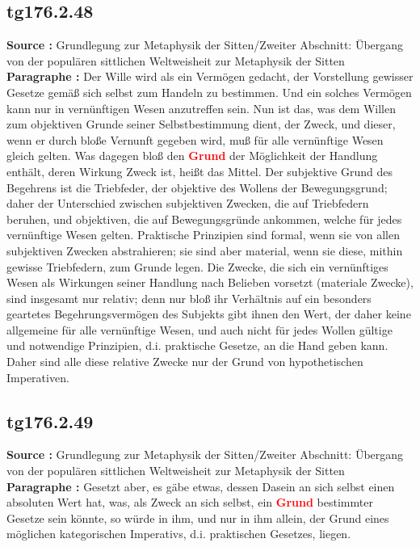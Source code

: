 \documentclass[a4paper,12pt,twoside]{book}
\newcommand{\match}[1]{\textcolor{red}{\textbf{#1}}}
\begin{document}
	\subsection*{tg176.2.48} 
	\textbf{Source : }Grundlegung zur Metaphysik der Sitten/Zweiter Abschnitt: Übergang von der populären sittlichen Weltweisheit zur Metaphysik der Sitten\\  
	
	\noindent\textbf{Paragraphe : }Der Wille wird als ein Vermögen gedacht, der Vorstellung gewisser Gesetze gemäß sich selbst zum Handeln zu bestimmen. Und ein solches Vermögen kann nur in vernünftigen Wesen anzutreffen sein. Nun ist das, was dem Willen zum objektiven Grunde seiner Selbstbestimmung dient, der Zweck, und dieser, wenn er durch bloße Vernunft gegeben wird, muß für alle vernünftige Wesen gleich gelten. Was dagegen bloß den \match{Grund} der Möglichkeit der Handlung enthält, deren Wirkung Zweck ist, heißt das Mittel. Der subjektive Grund des Begehrens ist die Triebfeder, der objektive des Wollens der Bewegungsgrund; daher der Unterschied zwischen subjektiven Zwecken, die auf Triebfedern beruhen, und objektiven, die auf Bewegungsgründe ankommen, welche für jedes vernünftige Wesen gelten. Praktische Prinzipien sind formal, wenn sie von allen subjektiven Zwecken abstrahieren; sie sind aber material, wenn sie diese, mithin gewisse Triebfedern, zum Grunde legen. Die Zwecke, die sich ein vernünftiges Wesen als Wirkungen seiner Handlung nach Belieben vorsetzt (materiale Zwecke), sind insgesamt nur relativ; denn nur bloß ihr Verhältnis auf ein besonders geartetes Begehrungsvermögen des Subjekts gibt ihnen den Wert, der daher keine allgemeine für alle vernünftige Wesen, und auch nicht für jedes Wollen gültige und notwendige Prinzipien, d.i. praktische Gesetze, an die Hand geben kann. Daher sind alle diese relative Zwecke nur der Grund von hypothetischen Imperativen. 
	
	\subsection*{tg176.2.49} 
	\textbf{Source : }Grundlegung zur Metaphysik der Sitten/Zweiter Abschnitt: Übergang von der populären sittlichen Weltweisheit zur Metaphysik der Sitten\\  
	
	\noindent\textbf{Paragraphe : }Gesetzt aber, es gäbe etwas, dessen Dasein an sich selbst einen absoluten Wert hat, was, als Zweck an sich selbst, ein \match{Grund} bestimmter Gesetze sein könnte, so würde in ihm, und nur in ihm allein, der Grund eines möglichen kategorischen Imperativs, d.i. praktischen Gesetzes, liegen. 
	
\end{document}
